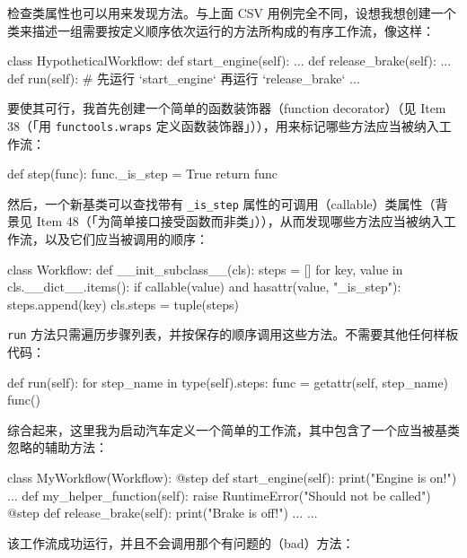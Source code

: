 检查类属性也可以用来发现方法。与上面 CSV 用例完全不同，设想我想创建一个类来描述一组需要按定义顺序依次运行的方法所构成的有序工作流，像这样：

\begin{codebox}[python]
class HypotheticalWorkflow:
    def start_engine(self):
        ...
    def release_brake(self):
        ...
    def run(self):
        # 先运行 `start_engine` 再运行 `release_brake`
        ...
\end{codebox}

要使其可行，我首先创建一个简单的函数装饰器（function decorator）（见 Item 38（「用 \texttt{functools.wraps} 定义函数装饰器」）），用来标记哪些方法应当被纳入工作流：

\begin{codebox}[python]
def step(func):
    func._is_step = True
    return func
\end{codebox}

然后，一个新基类可以查找带有 \texttt{\_is\_step} 属性的可调用（callable）类属性（背景见 Item 48（「为简单接口接受函数而非类」）），从而发现哪些方法应当被纳入工作流，以及它们应当被调用的顺序：

\begin{codebox}[python]
class Workflow:
    def __init_subclass__(cls):
        steps = []
        for key, value in cls.__dict__.items():
            if callable(value) and hasattr(value, "_is_step"):
                steps.append(key)
        cls.steps = tuple(steps)
\end{codebox}

\texttt{run} 方法只需遍历步骤列表，并按保存的顺序调用这些方法。不需要其他任何样板代码：

\begin{codebox}[python]
    def run(self):
        for step_name in type(self).steps:
            func = getattr(self, step_name)
            func()
\end{codebox}

综合起来，这里我为启动汽车定义一个简单的工作流，其中包含了一个应当被基类忽略的辅助方法：

\begin{codebox}[python]
class MyWorkflow(Workflow):
    @step
    def start_engine(self):
        print("Engine is on!")
        ...
    def my_helper_function(self):
        raise RuntimeError("Should not be called")
    @step
    def release_brake(self):
        print("Brake is off!")
        ...
    ...
\end{codebox}

该工作流成功运行，并且不会调用那个有问题的（bad）方法：


